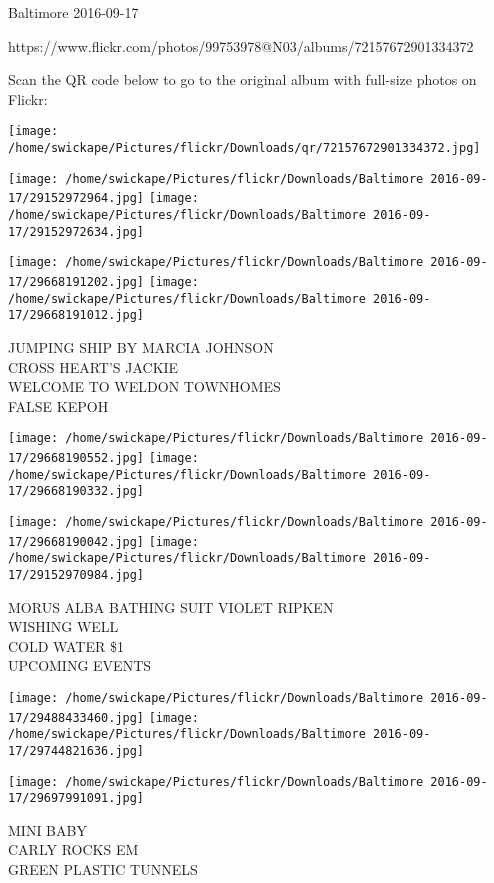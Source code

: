 \documentclass[10pt,letterpaper]{article}
\begin{document}
Baltimore 2016-09-17

https://www.flickr.com/photos/99753978@N03/albums/72157672901334372

Scan the QR code below to go to the original album with full-size photos on Flickr:

\texttt{[image: /home/swickape/Pictures/flickr/Downloads/qr/72157672901334372.jpg]}
\pagebreak

\texttt{[image: /home/swickape/Pictures/flickr/Downloads/Baltimore 2016-09-17/29152972964.jpg]}
\texttt{[image: /home/swickape/Pictures/flickr/Downloads/Baltimore 2016-09-17/29152972634.jpg]}

\texttt{[image: /home/swickape/Pictures/flickr/Downloads/Baltimore 2016-09-17/29668191202.jpg]}
\texttt{[image: /home/swickape/Pictures/flickr/Downloads/Baltimore 2016-09-17/29668191012.jpg]}

JUMPING SHIP BY MARCIA JOHNSON\\
CROSS HEART'S JACKIE\\
WELCOME TO WELDON TOWNHOMES\\
FALSE KEPOH
\pagebreak

\texttt{[image: /home/swickape/Pictures/flickr/Downloads/Baltimore 2016-09-17/29668190552.jpg]}
\texttt{[image: /home/swickape/Pictures/flickr/Downloads/Baltimore 2016-09-17/29668190332.jpg]}

\texttt{[image: /home/swickape/Pictures/flickr/Downloads/Baltimore 2016-09-17/29668190042.jpg]}
\texttt{[image: /home/swickape/Pictures/flickr/Downloads/Baltimore 2016-09-17/29152970984.jpg]}

MORUS ALBA BATHING SUIT VIOLET RIPKEN\\
WISHING WELL\\
COLD WATER \$1\\
UPCOMING EVENTS
\pagebreak

\texttt{[image: /home/swickape/Pictures/flickr/Downloads/Baltimore 2016-09-17/29488433460.jpg]}
\texttt{[image: /home/swickape/Pictures/flickr/Downloads/Baltimore 2016-09-17/29744821636.jpg]}

\texttt{[image: /home/swickape/Pictures/flickr/Downloads/Baltimore 2016-09-17/29697991091.jpg]}

MINI BABY\\
CARLY ROCKS EM\\
GREEN PLASTIC TUNNELS
\pagebreak
\end{document}
